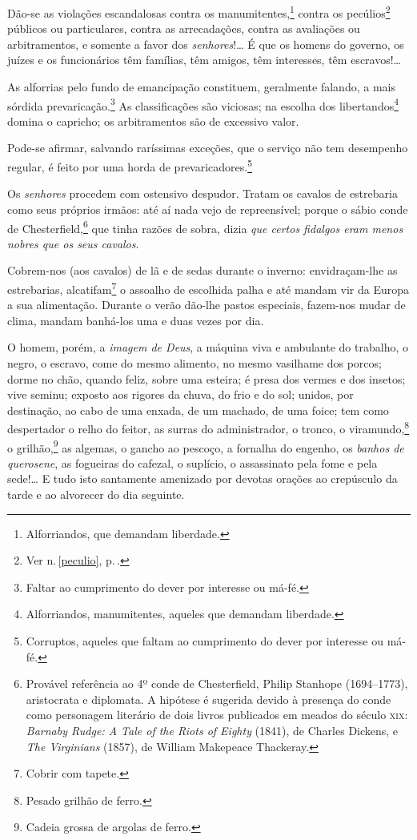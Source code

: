 Dão-se as violações escandalosas contra os manumitentes,\footnote{
  Alforriandos, que demandam liberdade.} contra os pecúlios\footnote{
  Ver n.\,\ref{peculio}, p.\,\pageref{peculio}.} públicos ou particulares, contra
as arrecadações, contra as avaliações ou arbitramentos, e somente a
favor dos \emph{senhores}!\ldots{} É que os homens do governo, os juízes e os
funcionários têm famílias, têm amigos, têm interesses, têm escravos!\ldots{}

As alforrias pelo fundo de emancipação constituem, geralmente falando, a mais sórdida
prevaricação.\footnote{
  Faltar ao cumprimento do dever por interesse ou má-fé.} As
classificações são viciosas; na escolha dos libertandos\footnote{
  Alforriandos, manumitentes, aqueles que demandam liberdade.} domina o
capricho; os arbitramentos são de excessivo valor.

Pode-se afirmar, salvando raríssimas exceções, que o serviço não tem
desempenho regular, é feito por uma horda de prevaricadores.\footnote{
  Corruptos, aqueles que   faltam ao cumprimento do dever por interesse ou má-fé.}

Os \emph{senhores} procedem com ostensivo despudor. Tratam os cavalos de
estrebaria como seus próprios irmãos: até aí nada vejo de repreensível;
porque o sábio conde de Chesterfield,\footnote{Provável referência ao
 4º conde de Chesterfield, Philip Stanhope (1694--1773), aristocrata e
 diplomata. A hipótese é sugerida devido à presença do conde como
  personagem literário de dois livros publicados em meados do século
  \textsc{xix}: \emph{Barnaby Rudge: A Tale of the Riots of Eighty} (1841), de
  Charles Dickens, e \emph{The Virginians} (1857), de William Makepeace 
  Thackeray.} que tinha razões de sobra, dizia \emph{que certos fidalgos
eram menos nobres que os seus cavalos}.

Cobrem-nos (aos cavalos) de lã e de sedas durante o inverno: %
envidraçam-lhe as estrebarias, alcatifam\footnote{Cobrir com tapete.}
o assoalho de escolhida palha e até mandam vir da Europa a sua
alimentação. Durante o verão dão-lhe pastos especiais, fazem-nos mudar
de clima, mandam banhá-los uma e duas vezes por dia.

O homem, porém, a \emph{imagem de Deus}, a máquina viva e ambulante do
trabalho, o negro, o escravo, come do mesmo alimento, no mesmo vasilhame
dos porcos; dorme no chão, quando feliz, sobre uma esteira; é presa dos
vermes e dos insetos; vive seminu; exposto aos rigores da chuva, do
frio e do sol; unidos, por destinação, ao cabo de uma enxada, de um
machado, de uma foice; tem como despertador o relho do feitor, as surras
do administrador, o tronco, o viramundo,\footnote{Pesado grilhão de
  ferro.} o grilhão,\footnote{Cadeia grossa de argolas de ferro.} as
algemas, o gancho ao pescoço, a fornalha do engenho, os \emph{banhos de
querosene}, as fogueiras do cafezal, o suplício, o assassinato pela fome
e pela sede!\ldots{} E tudo isto santamente amenizado por devotas orações ao
crepúsculo da tarde e ao alvorecer do dia seguinte.

